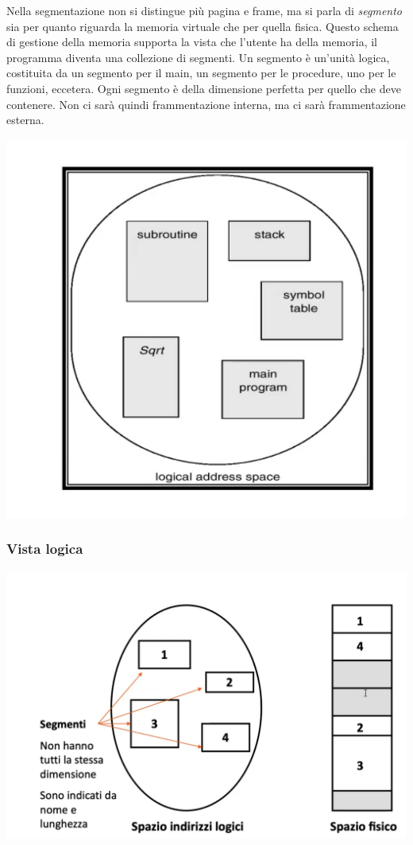 \documentclass[a4paper,12pt, twoside]{report}
\begin{document}
Nella segmentazione non si distingue pi\`u pagina e frame, ma si parla di \emph{segmento} sia per 
quanto riguarda la memoria virtuale che per quella fisica.
Questo schema di gestione della memoria supporta la vista che l'utente ha della memoria, il programma 
 diventa una collezione di segmenti. Un segmento \`e un'unit\`a logica, costituita da un 
segmento per il main, un segmento per le procedure, uno per le funzioni, eccetera.
Ogni segmento \`e della dimensione perfetta per quello che deve contenere. Non ci sar\`a quindi 
frammentazione interna, ma ci sar\`a frammentazione esterna. 
\begin{center}
\includegraphics[scale=0.2]{segmentation1} 
\end{center}

\subsubsection{Vista logica}
\begin{center}
    \includegraphics[scale=0.15]{segmentation2}
\end{center}
\end{document}
